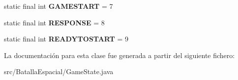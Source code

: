 \begin{DoxyCompactItemize}
\item 
\hypertarget{classBatallaEspacial_1_1GameState_a391f7ef1e969f8e77133b52339cab0f5}{
static final int {\bfseries GAMESTART} = 7}
\label{classBatallaEspacial_1_1GameState_a391f7ef1e969f8e77133b52339cab0f5}

\item 
\hypertarget{classBatallaEspacial_1_1GameState_a4794e0e1caca125321a06c021a5a1141}{
static final int {\bfseries RESPONSE} = 8}
\label{classBatallaEspacial_1_1GameState_a4794e0e1caca125321a06c021a5a1141}

\item 
\hypertarget{classBatallaEspacial_1_1GameState_a452d83e990f288cab0acb3a357621223}{
static final int {\bfseries READYTOSTART} = 9}
\label{classBatallaEspacial_1_1GameState_a452d83e990f288cab0acb3a357621223}

\end{DoxyCompactItemize}


La documentación para esta clase fue generada a partir del siguiente fichero:\begin{DoxyCompactItemize}
\item 
src/BatallaEspacial/GameState.java\end{DoxyCompactItemize}
